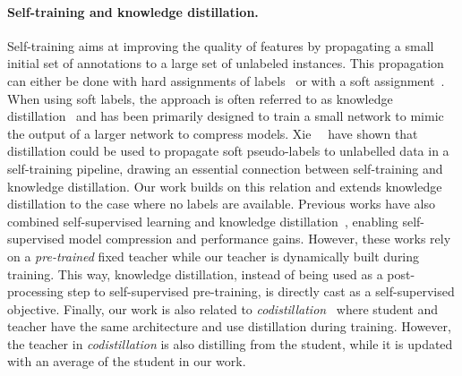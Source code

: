 \paragraph{Self-training and knowledge distillation.}
Self-training aims at improving the quality of features by propagating a small initial set of annotations to a large set of unlabeled instances.
This propagation can either be done with hard assignments of labels~\cite{lee2013pseudo,xu2020iterative,yalniz2019billion} or with a soft assignment~\cite{xie2020self}.
When using soft labels, the approach is often referred to as knowledge distillation~\cite{bucilua2006model,hinton2015distilling} and has been primarily designed to train a small network to mimic the output of a larger network to compress models.
Xie~\etal~\cite{xie2020self} have shown that distillation could be used to propagate soft pseudo-labels to unlabelled data in a self-training pipeline, drawing an essential connection between self-training and knowledge distillation.
Our work builds on this relation and extends knowledge distillation to the case where no labels are available.
Previous works have also combined self-supervised learning and knowledge distillation~\cite{fang2021seed,shen2021s2,chen2020big,noroozi2018boosting}, enabling self-supervised model compression and performance gains.
However, these works rely on a \emph{pre-trained} fixed teacher while our teacher is dynamically built during training.
This way, knowledge distillation, instead of being used as a post-processing step to self-supervised pre-training, is directly cast as a self-supervised objective.
Finally, our work is also related to \textit{codistillation}~\cite{anil2018large} where student and teacher have the same architecture and use distillation during training.
However, the teacher in \textit{codistillation} is also distilling from the student, while it is updated with an average of the student in our work.


